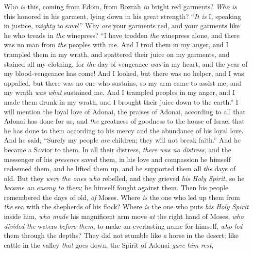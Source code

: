 \begin{biblechapter} %
 Who \textit{is} this, coming from Edom, 
from Bozrah \textit{in} bright red garments? 
\textit{Who is} this honored in his garment, 
lying down in his great strength? 
“\textit{It is} I, speaking in justice, 
\textit{mighty} to save!”
\verse Why \textit{are} your garments red, 
and your garments like he who treads in \textit{the} winepress?
\verse “I have trodden \textit{the} winepress alone, 
and there was no man from \textit{the} peoples with me. 
And I trod them in my anger, 
and I trampled them in my wrath, 
and spattered their juice on my garments, 
and stained all my clothing,
\verse for \textit{the} day of vengeance \textit{was} in my heart, 
and the year of my blood-vengeance has come!
\verse And I looked, but there was no helper, 
and I was appalled, but there was no one who sustains, 
so my arm came to assist me, 
and my wrath \textit{was what} sustained me.
\verse And I trampled peoples in my anger, 
and I made them drunk in my wrath, 
and I brought their juice down to the earth.”
 I will mention the loyal love of Adonai, the praises of Adonai, according to all that Adonai has done for us, 
and \textit{the} greatness of goodness to the house of Israel that he has done to them according to his mercy and the abundance of his loyal love.
\verse And he said, “Surely my people \textit{are} children; they will not break faith.” And he became a Savior to them.
\verse In all their distress, \textit{there was no distress}, 
and the messenger of his \textit{presence} saved them, 
in his love and compassion he himself redeemed them, 
and he lifted them up, 
and he supported them all \textit{the} days of old.
\verse But they \textit{were the ones who} rebelled, 
and they grieved \textit{his Holy Spirit}, 
so he \textit{became an enemy to them}; 
he himself fought against them.
\verse Then his people remembered the days of old, \textit{of} Moses. 
Where \textit{is} the one who led up them from \textit{the} sea with the shepherds of his flock? 
Where \textit{is} the one who puts \textit{his Holy Spirit} inside him,
\verse \textit{who made} his magnificent arm move \textit{at} the right hand of Moses, 
\textit{who divided} \textit{the} waters \textit{before them}, 
to make an everlasting name for himself,
\verse \textit{who led} them through the depths? 
They did not stumble like \textit{a} horse in the desert;
\verse like cattle in the valley \textit{that} goes down, the Spirit of Adonai \textit{gave him rest}, 

\end{biblechapter}
